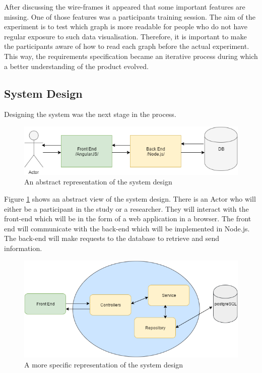 \documentclass{l4proj}
\begin{document}
After discussing the wire-frames it appeared that some important features are missing. One of those features was a participants training session. The aim of the experiment is to test which graph is more readable for people who do not have regular exposure to such data visualisation. Therefore, it is important to make the participants aware of how to read each graph before the actual experiment. This way, the requirements specification became an iterative process during which a better understanding of the product evolved.

\subsection{System Design}
Designing the system was the next stage in the process.

\begin{figure}[H]
\centering
\includegraphics[width=15cm]{abstractDesign.png}
\caption{An abstract representation of the system design}
\label{abstractDesign}
\end{figure}

Figure \ref{abstractDesign} shows an abstract view of the system design. There is an Actor who will either be a participant in the study or a researcher. They will interact with the front-end which will be in the form of a web application in a browser. The front end will communicate with the back-end which will be implemented in Node.js. The back-end will make requests to the database to retrieve and send information. 

\begin{figure}[H]
\centering
\includegraphics[width=15cm]{moreSpecificDesign.png}
\caption{A more specific representation of the system design}
\label{moreSpecificDesign}
\end{figure}
\end{document}
